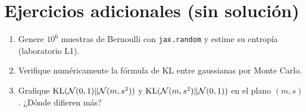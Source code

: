 \documentclass[11pt,a4paper]{article}
\begin{document}
\section{Ejercicios adicionales (sin solución)}
\begin{enumerate}[label=\textbf{P\arabic*.}]
\item Genere $10^6$ muestras de Bernoulli con \texttt{jax.random} y estime su entropía (laboratorio L1).
\item Verifique numéricamente la fórmula de KL entre gaussianas por Monte Carlo.
\item Grafique $\operatorname{KL}(\mathcal{N}(0,1)\|\mathcal{N}(m,s^2))$ y $\operatorname{KL}(\mathcal{N}(m,s^2)\|\mathcal{N}(0,1))$ en el plano $(m,s)$. ¿Dónde difieren más?
\end{enumerate}
\end{document}
